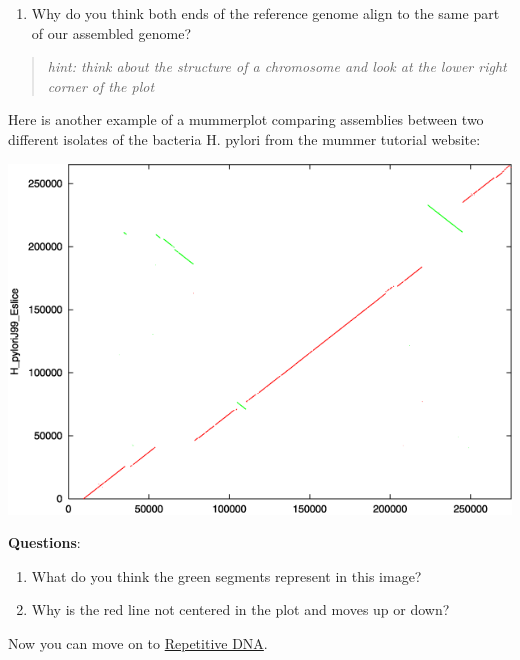 \documentclass[11pt]{article}
\providecommand{\tightlist}{%
      \setlength{\itemsep}{0pt}\setlength{\parskip}{0pt}}
\begin{document}
\begin{enumerate}
\def\labelenumi{\arabic{enumi}.}
\setcounter{enumi}{1}
\tightlist
\item
  Why do you think both ends of the reference genome align to the same
  part of our assembled genome?
\end{enumerate}

\begin{quote}
\textit{hint: think about the structure of a chromosome and look at the
lower right corner of the plot}
\end{quote}

Here is another example of a mummerplot comparing assemblies between two
different isolates of the bacteria H. pylori from the mummer tutorial
website:

\includegraphics{images/MUMMER_2.png}

\textbf{Questions}:

\begin{enumerate}
\def\labelenumi{\arabic{enumi}.}
\tightlist
\item
  What do you think the green segments represent in this image?
\item
  Why is the red line not centered in the plot and moves up or down?
\end{enumerate}

Now you can move on to \href{repetitive_dna.ipynb}{Repetitive DNA}.





\newpage
\end{document}
